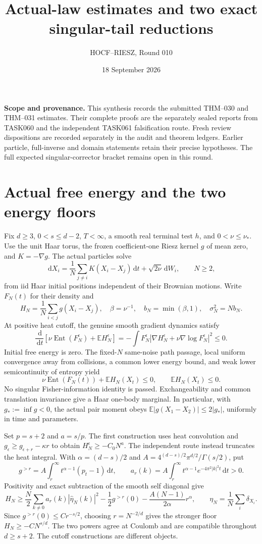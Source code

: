 \documentclass[10pt]{article}
\title{Actual-law estimates and two exact singular-tail reductions}
\author{HOCF--RIESZ, Round 010}
\date{18 September 2026}
\newcommand{\E}{\mathbb E}
\newcommand{\dd}{\,\mathrm d}
\begin{document}
\maketitle
\noindent\textbf{Scope and provenance.}
This synthesis records the submitted THM--030 and THM--031 estimates.
Their complete proofs are the separately sealed reports from TASK060 and
the independent TASK061 falsification route. Fresh review dispositions
are recorded separately in the audit and theorem ledgers. Earlier particle,
full-inverse and domain statements retain their precise hypotheses. The
full expected singular-corrector bracket remains open in this round.

\section*{Actual free energy and the two energy floors}
Fix $d\ge3$, $0<s\le d-2$, $T<\infty$, a smooth real terminal test $h$, and
$0<\nu\le\nu_*$. Use the unit Haar torus, the frozen coefficient-one Riesz
kernel $g$ of mean zero, and $K=-\nabla g$. The actual particles solve
\[
 \dd X_i=\frac1N\sum_{j\ne i}K(X_i-X_j)\dd t+\sqrt{2\nu}\dd W_i,
 \qquad N\ge2,
\]
from iid Haar initial positions independent of their Brownian motions.
Write $F_N(t)$ for their density and
\[
 H_N=\frac1N\sum_{i<j}g(X_i-X_j),\quad
 \beta=\nu^{-1},\quad b_N=\min(\beta,1),\quad\sigma_N^2=Nb_N.
\]
At positive heat cutoff, the genuine smooth gradient dynamics satisfy
\[
 \frac{\dd}{\dd t}\left[\nu\operatorname{Ent}(F_N^\epsilon)
                         +\E H_N^\epsilon\right]
 =-\int F_N^\epsilon
       |\nabla H_N^\epsilon+\nu\nabla\log F_N^\epsilon|^2\le0.
\]
Initial free energy is zero. The fixed-$N$ same-noise path passage, local
uniform convergence away from collisions, a common lower energy bound, and
weak lower semicontinuity of entropy yield
\[
 \nu\operatorname{Ent}(F_N(t))+\E H_N(X_t)\le0,
 \qquad \E H_N(X_t)\le0.
\]
No singular Fisher-information identity is passed. Exchangeability and common
translation invariance give a Haar one-body marginal. In particular, with
$g_*:=\inf g<0$, the actual pair moment obeys
$\E|g(X_1-X_2)|\le2|g_*|$, uniformly in time and parameters.

Set $p=s+2$ and $a=s/p$. The first construction uses heat convolution and
$g_\epsilon\ge g_{\epsilon+r}-\kappa r$ to obtain
$H_N^\epsilon\ge-C_0N^a$. The independent route instead truncates the heat
integral. With $\alpha=(d-s)/2$ and
$A=4^{(d-s)/2}\pi^{d/2}/\Gamma(s/2)$, put
\[
 g^{>r}=A\int_r^\infty t^{\alpha-1}(p_t-1)\dd t,
 \qquad a_r(k)=A\int_r^\infty t^{\alpha-1}e^{-4\pi^2|k|^2t}\dd t>0.
\]
Positivity and exact subtraction of the smooth self diagonal give
\[
 H_N\ge\frac N2\sum_{k\ne0}a_r(k)|\widehat\eta_N(k)|^2
          -\frac12g^{>r}(0)-\frac{A(N-1)}{2\alpha}r^\alpha,
 \qquad\eta_N=\frac1N\sum_i\delta_{X_i}.
\]
Since $g^{>r}(0)\le Cr^{-s/2}$, choosing $r=N^{-2/d}$ gives the stronger
floor $H_N\ge-CN^{s/d}$. The two powers agree at Coulomb and are compatible
throughout $d\ge s+2$. The cutoff constructions are different objects.
\end{document}

